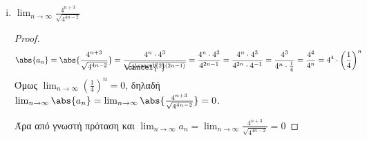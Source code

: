 \documentclass[a4paper,table]{report}
\begin{document}
\begin{enumerate}
\begin{enumerate}[i)]
      \item $ \lim_{n \to \infty} \frac{4^{n+3}}{\sqrt{4^{4n-2}}} $ 
        \begin{proof}
          \[
            \abs{a_{n}} = \abs{\frac{4^{n+3}}{\sqrt{4^{4n-2}}}} = 
            \frac{4^{n}\cdot 
            4^{3}}{\rlap{\cancel{\phantom{--}}}{\sqrt{4^{\cancel{2}(2n-1)}}}} = 
            \frac{4^{n} \cdot 4^{3}}{4^{2n-1}} = 
            \frac{4^{n}\cdot 4^{3}}{4^{2n}\cdot 4^{-1}} = 
            \frac{4^{3}}{4^{n}\cdot 
            \frac{1}{4}} = \frac{4^{4}}{4^{n}} = 4^{4}\cdot 
            \left(\frac{1}{4} \right) ^{n}
          \] 
          Όμως $ \lim_{n \to \infty} \left(\frac{1}{4}\right)^{n} = 0  $, 
          δηλαδή $ \lim_{n \to \infty} \abs{a_{n}} = \lim_{n \to \infty}
          \abs{\frac{4^{n+3}}{\sqrt{4^{4n-2}}}} = 0 $. 

          Άρα από γνωστή πρόταση και
          $ \lim_{n \to \infty} a_{n} =  \lim_{n \to \infty} 
          \frac{4^{n+3}}{\sqrt{4^{4n-2}}} = 0 $ 
        \end{proof}
    \end{enumerate}
\end{enumerate}
\end{document}
